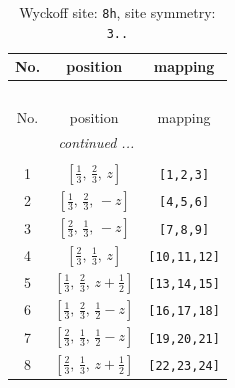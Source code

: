 \documentclass[fleqn,8pt]{jsarticle}
\begin{document}
\begin{longtable}{ccc}
\caption{Wyckoff site: {\tt 8h}, site symmetry: {\tt 3..}}
 \\
 \hline \hline
No. & position & mapping \\ \hline \endfirsthead

\multicolumn{2}{l}{\tablename\ \thetable{}} \\
 \hline \hline
No. & position & mapping \\ \hline \endhead

 \hline \hline
\multicolumn{2}{r}{\footnotesize\it continued ...} \\ \endfoot

 \hline \hline
\multicolumn{2}{r}{} \\ \endlastfoot

1 & $\left[ \frac{1}{3},\, \frac{2}{3},\, z \right]$ & {\tt [1,2,3]} \\ \hline
2 & $\left[ \frac{1}{3},\, \frac{2}{3},\, - z \right]$ & {\tt [4,5,6]} \\ \hline
3 & $\left[ \frac{2}{3},\, \frac{1}{3},\, - z \right]$ & {\tt [7,8,9]} \\ \hline
4 & $\left[ \frac{2}{3},\, \frac{1}{3},\, z \right]$ & {\tt [10,11,12]} \\ \hline
5 & $\left[ \frac{1}{3},\, \frac{2}{3},\, z + \frac{1}{2} \right]$ & {\tt [13,14,15]} \\ \hline
6 & $\left[ \frac{1}{3},\, \frac{2}{3},\, \frac{1}{2} - z \right]$ & {\tt [16,17,18]} \\ \hline
7 & $\left[ \frac{2}{3},\, \frac{1}{3},\, \frac{1}{2} - z \right]$ & {\tt [19,20,21]} \\ \hline
8 & $\left[ \frac{2}{3},\, \frac{1}{3},\, z + \frac{1}{2} \right]$ & {\tt [22,23,24]} \\
\end{longtable}
\renewcommand{\arraystretch}{1.2}
\end{document}
